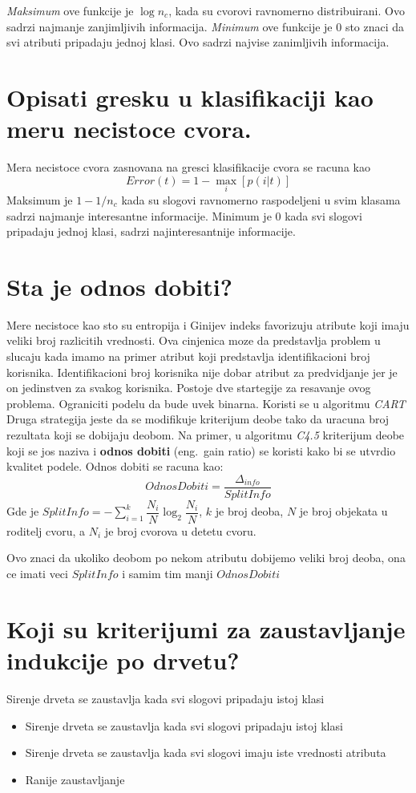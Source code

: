 \documentclass[a4paper]{article}
\begin{document}
\emph{Maksimum} ove funkcije je \(\log n_c\), kada su cvorovi ravnomerno distribuirani. Ovo sadrzi
najmanje zanjimljivih informacija. \emph{Minimum} ove funkcije je \(0\) sto znaci da svi atributi
pripadaju jednoj klasi. Ovo sadrzi najvise zanimljivih informacija.

\section{Opisati gresku u klasifikaciji kao meru necistoce cvora.}
Mera necistoce cvora zasnovana na gresci klasifikacije cvora se racuna kao
\[
    Error(t) = 1 - \max_i[p(i|t)]
\]
Maksimum je \(1-1/n_c\) kada su slogovi ravnomerno raspodeljeni u svim klasama sadrzi najmanje
interesantne informacije. Minimum je \(0\) kada svi slogovi pripadaju jednoj klasi, sadrzi
najinteresantnije informacije.

\section{Sta je odnos dobiti?}
Mere necistoce kao sto su entropija i Ginijev indeks favorizuju atribute koji imaju veliki broj
razlicitih vrednosti. Ova cinjenica moze da predstavlja problem u slucaju kada imamo na primer
atribut koji predstavlja identifikacioni broj korisnika. Identifikacioni broj korisnika nije dobar
atribut za predvidjanje jer je on jedinstven za svakog korisnika. Postoje dve startegije za
resavanje ovog problema.  Ograniciti podelu da bude uvek binarna. Koristi se u algoritmu \emph{CART}
Druga strategija jeste da se modifikuje kriterijum deobe tako da uracuna broj rezultata koji se
dobijaju deobom. Na primer, u algoritmu \emph{C4.5} kriterijum deobe koji se jos naziva i
\textbf{odnos dobiti} (eng.\ gain ratio) se koristi kako bi se utvrdio kvalitet podele. Odnos dobiti
se racuna kao:
\begin{equation}
    \label{eq:odnos_dobiti}
    OdnosDobiti = \dfrac{\Delta_{info}}{SplitInfo}
\end{equation}
Gde je \(SplitInfo = -\sum_{i=1}^{k}\dfrac{N_i}{N}\log_2\dfrac{N_i}{N}\), \(k\) je broj deoba, \(N\)
je broj objekata u roditelj cvoru, a \(N_i\) je broj cvorova u detetu cvoru.

Ovo znaci da ukoliko deobom po nekom atributu dobijemo veliki broj deoba, ona ce imati veci
\(SplitInfo\) i samim tim manji \(OdnosDobiti\)

\section{Koji su kriterijumi za zaustavljanje indukcije po drvetu?}
Sirenje drveta se zaustavlja kada svi slogovi pripadaju istoj klasi
\begin{itemize}
    \item Sirenje drveta se zaustavlja kada svi slogovi pripadaju istoj klasi
    \item Sirenje drveta se zaustavlja kada svi slogovi imaju iste vrednosti atributa
    \item Ranije zaustavljanje
\end{itemize}
\end{document}
